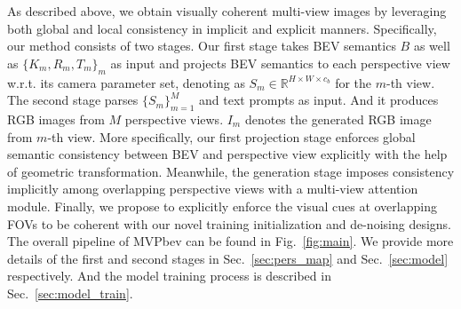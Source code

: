 As described above, we obtain visually coherent multi-view images by leveraging both global and local consistency in implicit and explicit manners. Specifically, our method consists of two stages. Our first stage takes BEV semantics $\textit{B}$ as well as $\{K_m,R_m,T_m\}_m$ as input and projects BEV semantics to each perspective view w.r.t. its camera parameter set, denoting as $S_m\in\mathbb{R}^{H\times W\times c_b}$ for the $m$-th view. The second stage parses $\{S_m\}_{m=1}^M$ and text prompts as input. And it produces RGB images from $M$ perspective views. $I_m$ denotes the generated RGB image from $m$-th view. 
More specifically, our first projection stage enforces global semantic consistency between BEV and perspective view explicitly with the help of geometric transformation. Meanwhile, the generation stage imposes consistency implicitly among overlapping perspective views with a multi-view attention module. Finally, we propose to explicitly enforce the visual cues at overlapping FOVs to be coherent with our novel training initialization and de-noising designs. The overall pipeline of MVPbev can be found in Fig.~\ref{fig:main}. We provide more details of the first and second stages in Sec.~\ref{sec:pers_map} and Sec.~\ref{sec:model} respectively. And the model training process is described in Sec.~\ref{sec:model_train}.



